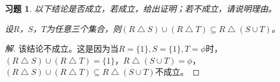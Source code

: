 \documentclass{article}
\begin{document}
\begin{CJK}{UTF8}{gbsn}
  \newtheorem*{Ex}{习题}
  \begin{Ex}
    以下结论是否成立，若成立，给出证明；若不成立，请说明理由。
    
      设$R$，$S$，$T$为任意三个集合，则$ (R\bigtriangleup S)\cup (R\bigtriangleup T)\subseteq R\bigtriangleup (S\cup T)$。
\end{Ex}
\begin{proof}[解]
  该结论不成立。这是因为当$R=\{1\}, S=\{1\}, T = \phi$时，$(R\bigtriangleup S)\cup (R\bigtriangleup T)=\{1\}$，$R\bigtriangleup (S\cup T)=\phi$， $(R\bigtriangleup S)\cup (R\bigtriangleup T)\subseteq R\bigtriangleup (S\cup T)$不成立。
\end{proof}
\end{CJK}
\end{document}
